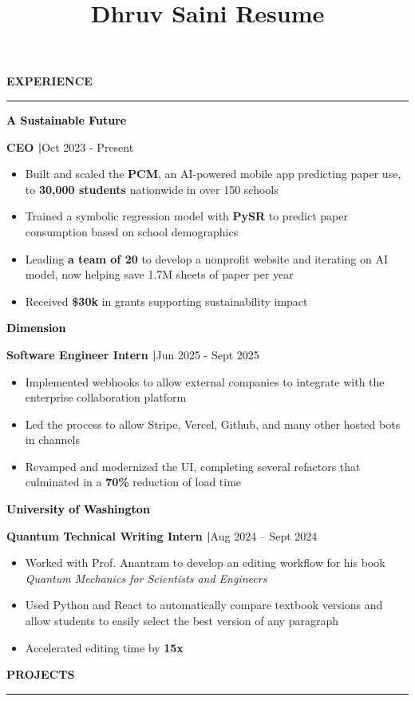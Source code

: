 \documentclass[8pt,a4paper]{altacv}
\title{Dhruv Saini Resume}
\makeatletter
\newcommand{\resumebodysize}{\fontsize{8pt}{9pt}\selectfont}
\renewcommand{\divider}{\textcolor{body!30}{\hdashrule{\linewidth}{0.6pt}{0.285em}}\vspace{4.096pt}}
\renewcommand{\makecvheader}{%
  \begingroup
    \raggedright\color{emphasis}%
    {\Huge\bfseries\MakeUppercase{\@name}\par}
    \vspace{4.3pt}
    {\small\bfseries\@personalinfo\par}
  \endgroup
}
\renewcommand{\cvsection}[2][]{%
  \bigskip%
  \vspace{3.686pt}%
  \ifstrequal{#1}{}{}{\marginpar{\vspace*{\dimexpr1pt-\baselineskip}\raggedright}}%
  {\color{heading}\large\bfseries\MakeUppercase{#2}}\\[-1ex]\vspace{1.489pt}%
  {\color{heading}\rule{\linewidth}{2pt}\par}\medskip\vspace{1.179pt}
}
\renewcommand{\cvevent}[4]{%
  {\fontsize{9pt}{9pt}\selectfont\color{black}\hspace*{-0.282pt}#1\par}
  \ifstrequal{#2}{}{}{%
    \vspace{2.144pt}
    {\fontsize{9pt}{9pt}\selectfont\textbf{\color{accent}#2}\hspace{0.5em}\resumebodysize\faCalendar\hspace{0.5em}#3\par}%
  }%
  \vspace{2.145pt}\resumebodysize
}
\makeatother
\begin{document}
\makecvheader
\vskip0.917pt
\resumebodysize

\cvsection{Experience}
\vskip0.464pt

\cvevent{\textcolor{black}{\textbf{A Sustainable Future}}}{\textnormal{CEO |}}{Oct 2023 - Present}{}
\begin{itemize}
\item Built and scaled the \textbf{PCM}, an AI-powered mobile app predicting paper use, to \textbf{30,000 students} nationwide in over 150 schools
\item Trained a symbolic regression model with \textbf{PySR} to predict paper consumption based on school demographics
\item Leading \textbf{a team of 20} to develop a nonprofit website and iterating on AI model, now helping save 1.7M sheets of paper per year
\item Received \textbf{\$30k} in grants supporting sustainability impact
\end{itemize}
\divider

\cvevent{\textcolor{black}{\textbf{Dimension}}}{\textnormal{Software Engineer Intern |}}{Jun 2025 - Sept 2025}{}
\begin{itemize}
\item Implemented webhooks to allow external companies to integrate with the enterprise collaboration platform
\item Led the process to allow Stripe, Vercel, Github, and many other hosted bots in channels
\item Revamped and modernized the UI, completing several refactors that culminated in a \textbf{70\%} reduction of load time
\end{itemize}
\divider

\cvevent{\textcolor{black}{\textbf{University of Washington}}}{\textnormal{Quantum Technical Writing Intern |}}{Aug 2024 – Sept 2024}{}
\begin{itemize}
\item Worked with Prof. Anantram to develop an editing workflow for his book \textit{Quantum Mechanics for Scientists and Engineers}
\item Used Python and React to automatically compare textbook versions and allow students to easily select the best version of any paragraph
\item Accelerated editing time by \textbf{15x}
\end{itemize}

\vskip-4.265pt
\cvsection{Projects}
\vskip-1.479pt
\end{document}
